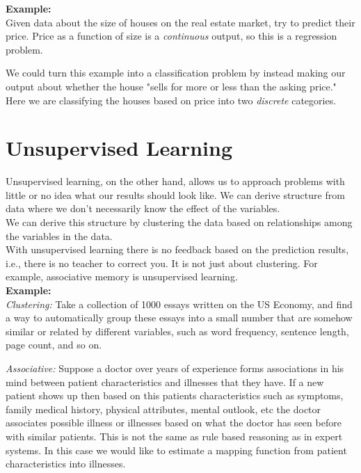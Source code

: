 \documentclass[english]{article}
\begin{document}
\textbf{Example:}\\

Given data about the size of houses on the real estate market, try to predict
their price. Price as a function of size is a \textit{continuous} output, so
this is a regression problem.

We could turn this example into a classification problem by instead making our
output about whether the house "sells for more or less than the asking price."
Here we are classifying the houses based on price into two \textit{discrete}
categories.

\section{Unsupervised Learning}
Unsupervised learning, on the other hand, allows us to approach problems with
little or no idea what our results should look like. We can derive structure
from data where we don't necessarily know the effect of the variables.\\

We can derive this structure by clustering the data based on relationships among
the variables in the data.\\

With unsupervised learning there is no feedback based on the prediction results,
i.e., there is no teacher to correct you. It is not just about clustering.
For example, associative memory is unsupervised learning.\\

\textbf{Example:}\\

\textit{Clustering:} Take a collection of 1000 essays written on the US Economy,
and find a way to automatically group these essays into a small number that are
somehow similar or related by different variables, such as word frequency,
sentence length, page count, and so on.

\textit{Associative:}  Suppose a doctor over years of experience forms
associations in his mind between patient characteristics and illnesses that
they have. If a new patient shows up then based on this patients characteristics
such as symptoms, family medical history, physical attributes, mental outlook,
etc the doctor associates possible illness or illnesses based on what the doctor
has seen before with similar patients. This is not the same as rule based
reasoning as in expert systems. In this case we would like to estimate a mapping
function from patient characteristics into illnesses.
\end{document}
